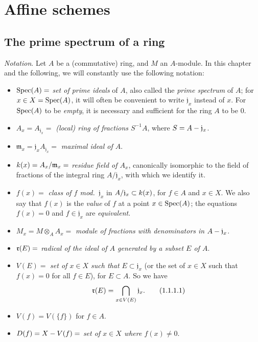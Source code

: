 \setcounter{section}{0}
\section{Affine schemes}
\label{section:1.1}

\setcounter{subsection}{0}
\subsection{The prime spectrum of a ring}
\label{subsection:1.1.1}

\begin{env}[1.1.1]
\label{1.1.1.1}
\emph{Notation}. Let $A$ be a (commutative) ring, and $M$ an $A$-module.
In this chapter and the following, we will constantly use the following notation:
\begin{itemize}
  \item $\operatorname{Spec}(A)=$ \emph{set of prime ideals} of $A$, also called the \emph{prime spectrum} of $A$; for $x\in X=\operatorname{Spec}(A)$, it will often be convenient to write $\mathfrak{j}_x$ instead of $x$.
    For $\operatorname{Spec}(A)$ to be \emph{empty}, it is necessary and sufficient for the ring $A$ to be $0$.
  \item $A_x=A_{\mathfrak{j}_x}=$ \emph{(local) ring of fractions $S^{-1}A$}, where $S=A-\mathfrak{j}_x$.
  \item $\mathfrak{m}_x=\mathfrak{j}_x A_{\mathfrak{j}_x}=$ \emph{maximal ideal of $A$}.
  \item $k(x)=A_x/\mathfrak{m}_x=$ \emph{residue field of $A_x$}, canonically isomorphic to the field of fractions of the integral ring $A/\mathfrak{j}_x$, with which we identify it.
  \item $f(x)=$ \emph{class of $f$ mod.~$\mathfrak{j}_x$} in $A/\mathfrak{j}_x\subset k(x)$, for $f\in A$ and $x\in X$.
    We also say that $f(x)$ is the \emph{value} of $f$ at a point $x\in\operatorname{Spec}(A)$; the equations $f(x)=0$ and $f\in\mathfrak{j}_x$ are \emph{equivalent}.
  \item $M_x=M\otimes_A A_x=$ \emph{module of fractions with denominators in $A-\mathfrak{j}_x$}.
  \item $\mathfrak{r}(E)=$ \emph{radical of the ideal of $A$ generated by a subset $E$ of $A$}.
  \item $V(E)=$ \emph{set of $x\in X$ such that $E\subset\mathfrak{j}_x$} (or the set of $x\in X$ such that $f(x)=0$ for all $f\in E$), for $E\subset A$.
    So we have
    \[
    \label{eq:1.1.1.1.1}
      \mathfrak{r}(E)=\bigcap_{x\in V(E)}\mathfrak{j}_x.
      \tag{1.1.1.1}
    \]
  \item $V(f)=V(\{f\})$ for $f\in A$.
  \item $D(f)=X- V(f)=$ \emph{set of $x\in X$ where $f(x)\neq 0$}.
\end{itemize}
\end{env}

